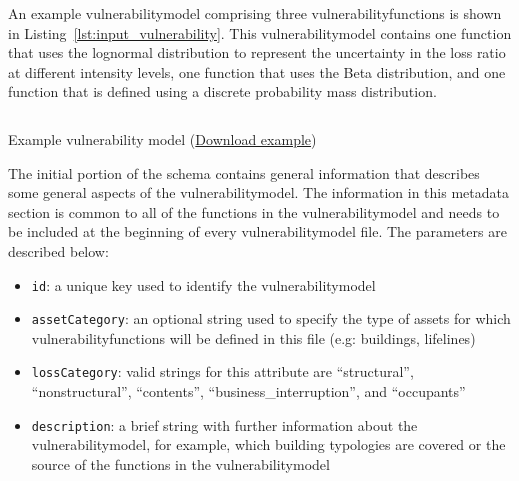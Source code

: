 An example \gls{vulnerabilitymodel} comprising three
\glspl{vulnerabilityfunction} is shown in
Listing~\ref{lst:input_vulnerability}. This \gls{vulnerabilitymodel} contains
one function that uses the lognormal distribution to represent the uncertainty
in the loss ratio at different intensity levels, one function that uses the
Beta distribution, and one function that is defined using a discrete
probability mass distribution.

\begin{listing}[htbp]
  \inputminted[firstline=1,firstnumber=1,fontsize=\footnotesize,frame=single,linenos,bgcolor=lightgray]{xml}{oqum/risk/Verbatim/input_vulnerability.xml}
  \caption{Example vulnerability model (\href{https://raw.githubusercontent.com/GEMScienceTools/oq-engine-docs/master/oqum/risk/verbatim/input_vulnerability.xml}{Download example})}
  \label{lst:input_vulnerability}
\end{listing}


The initial portion of the schema contains general information that describes
some general aspects of the \gls{vulnerabilitymodel}. The information in this
metadata section is common to all of the functions in the
\gls{vulnerabilitymodel} and needs to be included at the beginning of every
\gls{vulnerabilitymodel} file. The parameters are described below:

\begin{itemize}

    \item \Verb+id+: a unique key used to identify the \gls{vulnerabilitymodel}

    \item \Verb+assetCategory+: an optional string used to specify the type of
    \glspl{asset} for which \glspl{vulnerabilityfunction} will be defined in this file 
    (e.g: buildings, lifelines)

    \item \Verb+lossCategory+: valid strings for this attribute are 
    ``structural'', ``nonstructural'', ``contents'',  
    ``business\_interruption'', and ``occupants''

    \item \Verb+description+: a brief string with further information about the
    \gls{vulnerabilitymodel}, for example, which building typologies are 
    covered or the source of the functions in the \gls{vulnerabilitymodel}

\end{itemize}

\inputminted[firstline=4,firstnumber=4,lastline=8,fontsize=\footnotesize,frame=single,linenos,bgcolor=lightgray]{xml}{oqum/risk/Verbatim/input_vulnerability.xml}


